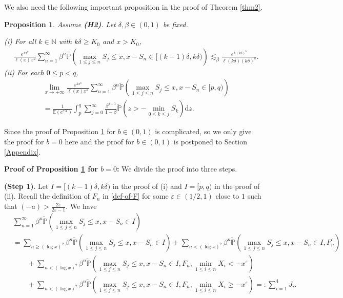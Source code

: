 \documentclass[11pt]{article}
\newtheorem{prop}[thrm]{Proposition}
\numberwithin{equation}{section}
\begin{document}
We  also need the following important proposition in the proof of Theorem \ref{thm2}. 

\begin{prop}\label{prop3}
	Assume {\bf(H2)}.  Let $\delta, \beta \in (0,1)$ be fixed.
	
	(i) For all $k\in \mathbb{N}$ with $k\delta\geq K_0$ and $x>K_0$, 
	\begin{align}
		&\frac{e^{\lambda x^b}}{\ell(x) x^a } \sum_{n=1}^\infty \beta^{n}\widetilde{\mathbb{P}}\left(\max_{1\leq j \leq n} S_j \leq x, x-S_n\in [(k-1)\delta, k\delta) \right) \lesssim_\beta  \frac{e^{\lambda (k\delta)^b}}{\ell(k\delta) (k\delta)^a }.
	\end{align}
	(ii) For each $0\leq p< q$, 
	\begin{align}
		& \lim_{x\to+\infty} \frac{e^{\lambda x^b}}{\ell(x) x^a } \sum_{n=1}^\infty \beta^{n}\widetilde{\mathbb{P}}\left(\max_{1\leq j \leq n} S_j \leq x, x-S_n\in [p, q) \right) \nonumber\\
		&=\frac{1}{\mathbb{E}(e^{\gamma X})}\int_p^q \sum_{j=0}^\infty \frac{\beta^{j+1}}{1-\beta} \widetilde{\mathbb{P}}\left(z> -\min_{0\leq k\leq j} S_k \right)\mathrm{d} z. 
	\end{align}
\end{prop}

Since the proof of Proposition \ref{prop3} for $b\in (0,1)$ is complicated, so we only give the proof for $b=0$ here and the proof for $b\in (0,1)$ is postponed to Section \ref{Appendix}.  

\noindent
\textbf{Proof of Proposition \ref{prop3} for $b=0$:} We divide the proof into three steps.

\noindent
{\bf(Step 1)}. 
Let $I=[(k-1)\delta, k\delta)$ in the proof of (i) and $I= [p,q)$ in the proof of (ii). Recall the definition of $F_n$ in \eqref{def-of-F} for some $\varepsilon\in (1/2,1)$ close to $1$ such that $(-a)>\frac{2\varepsilon}{2\varepsilon -1}$.
We have 
\begin{align}\label{decom-J}
	& \sum_{n=1}^\infty  \beta^{n}\widetilde{\mathbb{P}}\left(\max_{1\leq j \leq n} S_j \leq x, x-S_n\in I\right)\nonumber\\
	& =  \sum_{n\geq (\log x)^2}  \beta^{n}\widetilde{\mathbb{P}}\left(\max_{1\leq j \leq n} S_j \leq x, x-S_n\in I\right) +  \sum_{n< (\log x)^2}  \beta^{n}\widetilde{\mathbb{P}}\left(\max_{1\leq j \leq n} S_j \leq x, x-S_n\in I, F_n^c \right)\nonumber\\
	&\qquad + \sum_{n < (\log x)^2}  \beta^{n}\widetilde{\mathbb{P}}\left(\max_{1\leq j \leq n} S_j \leq x, x-S_n\in I , F_n,  \min_{1\leq i\leq n} X_i<-x^{\varepsilon}\right) \nonumber\\
	& \qquad+  \sum_{n<(\log x)^2} \beta^{n}\widetilde{\mathbb{P}}\left(\max_{1\leq j \leq n} S_j \leq x, x-S_n\in I, F_n, \min_{1\leq i\leq n} X_i\geq -x^{\varepsilon}\right) =: \sum_{i=1}^4 J_i.
\end{align}
\end{document}
